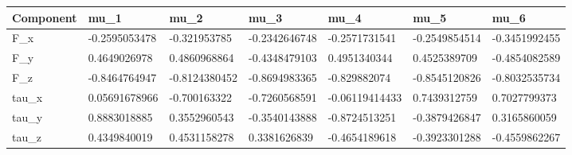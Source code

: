 \begin{tabular}{@{}lllllll@{}}
\toprule
Component & mu\_1 & mu\_2 & mu\_3 & mu\_4 & mu\_5 & mu\_6 \\
\midrule
F\_x & -0.2595053478 & -0.321953785 & -0.2342646748 & -0.2571731541 & -0.2549854514 & -0.3451992455 \\
F\_y & 0.4649026978 & 0.4860968864 & -0.4348479103 & 0.4951340344 & 0.4525389709 & -0.4854082589 \\
F\_z & -0.8464764947 & -0.8124380452 & -0.8694983365 & -0.829882074 & -0.8545120826 & -0.8032535734 \\
tau\_x & 0.05691678966 & -0.700163322 & -0.7260568591 & -0.06119414433 & 0.7439312759 & 0.7027799373 \\
tau\_y & 0.8883018885 & 0.3552960543 & -0.3540143888 & -0.8724513251 & -0.3879426847 & 0.3165860059 \\
tau\_z & 0.4349840019 & 0.4531158278 & 0.3381626839 & -0.4654189618 & -0.3923301288 & -0.4559862267 \\
\bottomrule
\end{tabular}
